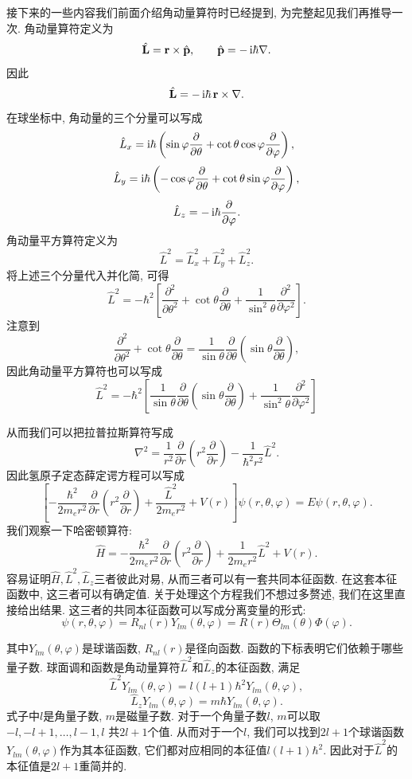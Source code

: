 接下来的一些内容我们前面介绍角动量算符时已经提到, 为完整起见我们再推导一次. 角动量算符定义为
\[
\hat{\mathbf L}
=
\mathbf r \times \hat{\mathbf p},
\qquad
\hat{\mathbf p}
=
-\mathop{}\!\mathrm{i}\hbar \nabla .
\]
因此
\[
\hat{\mathbf L}
=
-\mathop{}\!\mathrm{i}\hbar \, \mathbf r \times \nabla .
\]
在球坐标中, 角动量的三个分量可以写成
\[
\hat L_x
=
\mathop{}\!\mathrm{i}\hbar
\left(
\sin\varphi \frac{\partial}{\partial \theta}
+
\cot\theta \cos\varphi \frac{\partial}{\partial \varphi}
\right),
\]
\[
\hat L_y
=
\mathop{}\!\mathrm{i}\hbar
\left(
-\cos\varphi \frac{\partial}{\partial \theta}
+
\cot\theta \sin\varphi \frac{\partial}{\partial \varphi}
\right),
\]
\[
\hat L_z
=
-\mathop{}\!\mathrm{i}\hbar \frac{\partial}{\partial \varphi}.
\]
角动量平方算符定义为
\[
\hat L^2
=
\hat L_x^2+\hat L_y^2+\hat L_z^2 .
\]
将上述三个分量代入并化简, 可得
\[
\hat L^2
=
-\hbar^2
\left[
\frac{\partial^2}{\partial \theta^2}
+
\cot\theta \frac{\partial}{\partial \theta}
+
\frac{1}{\sin^2\theta}
\frac{\partial^2}{\partial \varphi^2}
\right].
\]
注意到
\[
\frac{\partial^2}{\partial \theta^2}
+
\cot\theta \frac{\partial}{\partial \theta}
=
\frac{1}{\sin\theta}
\frac{\partial}{\partial \theta}
\left(
\sin\theta
\frac{\partial}{\partial \theta}
\right),
\]
因此角动量平方算符也可以写成
\[
\hat L^2
=
-\hbar^2
\left[
\frac{1}{\sin\theta}
\frac{\partial}{\partial \theta}
\left(
\sin\theta
\frac{\partial}{\partial \theta}
\right)
+
\frac{1}{\sin^2\theta}
\frac{\partial^2}{\partial \varphi^2}
\right]
\]

从而我们可以把拉普拉斯算符写成
\[
\nabla^2 = \frac{1}{r^2}\frac{\partial}{\partial r}\left(r^2\frac{\partial}{\partial r}\right) - \frac{1}{\hbar^2 r^2} \hat L^2.
\]
因此氢原子定态薛定谔方程可以写成
\[
\left[-\frac{\hbar^2}{2m_e r^2}\frac{\partial}{\partial r}\left(r^2\frac{\partial}{\partial r}\right)+\frac{\hat L^2}{2m_e r^2}+V(r)\right]\psi(r, \theta, \varphi) = E\psi(r, \theta, \varphi).
\]
我们观察一下哈密顿算符:
\[
\hat{H} = -\frac{\hbar^2}{2m_e r^2}\frac{\partial}{\partial r}\left(r^2\frac{\partial}{\partial r}\right) + \frac{1}{2m_e r^2} \hat L^2 + V(r).
\]
容易证明$\hat{H}, \hat{L}^2, \hat{L}_z$三者彼此对易, 从而三者可以有一套共同本征函数. 在这套本征函数中, 这三者可以有确定值. 关于处理这个方程我们不想过多赘述, 我们在这里直接给出结果. 这三者的共同本征函数可以写成分离变量的形式:
\[
\psi(r, \theta, \varphi) = R_{nl}(r)Y_{lm}(\theta, \varphi) =R(r)\Theta_{lm}(\theta)\Phi(\varphi).
\]

其中$Y_{lm}(\theta, \varphi)$是球谐函数, $R_{nl}(r)$是径向函数. 函数的下标表明它们依赖于哪些量子数. 球面调和函数是角动量算符$\hat{L}^2$和$\hat{L}_z$的本征函数, 满足
\[
\hat{L}^2 Y_{lm}(\theta, \varphi) =  l(l+1)\hbar^2 Y_{lm}(\theta, \varphi),
\]
\[
\hat{L}_z Y_{lm}(\theta, \varphi) =  m\hbar Y_{lm}(\theta, \varphi).
\]
式子中$l$是角量子数, $m$是磁量子数. 对于一个角量子数$l$, $m$可以取 $-l, -l+1, \ldots, l-1, l$ 共$2l+1$个值. 从而对于一个$l$, 我们可以找到$2l+1$个球谐函数$Y_{lm}(\theta, \varphi)$作为其本征函数, 它们都对应相同的本征值$l(l+1)\hbar^2$. 因此对于$\hat{L}^2$的本征值是$2l+1$重简并的.

